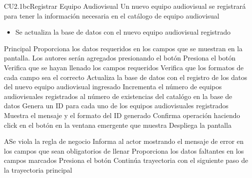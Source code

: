 \begin{UseCase}{CU2.1bc}{Registrar Equipo Audiovisual}{
	Un nuevo equipo audiovisual se registrará para tener la información necesaria en el catálogo de equipo audiovisual
}
{			\begin{itemize}
				\item Se actualiza la base de datos con el nuevo equipo audiovisual registrado
			\end{itemize}			
		}
\end{UseCase}


\begin{UCtrayectoria}{Principal}
		\UCpaso[\UCactor] Proporciona los datos requeridos en los campos que se muestran en la pantalla. Los autores serán agregados presionando el botón 
		\UCpaso[\UCactor] Presiona el botón  
		\UCpaso[\UCsist] Verifica que se hayan llenado los campos requeridos 
		\UCpaso[\UCsist] Verifica que los formatos de cada campo sea el correcto 
		\UCpaso[\UCsist] Actualiza la base de datos con el registro de los datos del nuevo equipo audiovisual ingresado 
		\UCpaso[\UCsist] Incrementa el número de equipos audiovisuales registrados al número de existencias del catalógo en la base de datos
		\UCpaso[\UCsist] Genera un ID para cada uno de los equipos audiovisuales registrados
		\UCpaso[\UCsist] Muestra el mensaje  y el formato del ID generado
		\UCpaso[\UCactor] Confirma operación haciendo click en el botón  en la ventana emergente que muestra
		\UCpaso[\UCsist] Despliega la pantalla 
\end{UCtrayectoria}



\begin{UCtrayectoriaA}{A}{Se viola la regla de negocio }	
			\UCpaso[\UCsist] Informa al actor mostrando el mensaje de error  en los campos que sean obligatorios de llenar
			\UCpaso[\UCactor] Proporciona los datos faltantes en los campos marcados 
			\UCpaso[\UCactor] Presiona el botón   
			\UCpaso[\UCsist] Continúa trayectoria con el siguiente paso de la trayectoria principal 
\end{UCtrayectoriaA}

